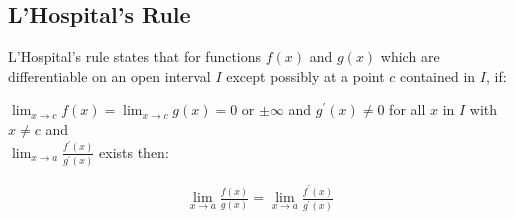 \subsection{L'Hospital's Rule}
L'Hospital's rule states that for functions $f(x)$ and $g(x)$ which are differentiable on an open interval $I$ except possibly at a point $c$ contained in $I$, if:

\vspace{5mm}

\noindent
$ \lim_{x \to c} f(x) = \lim_{x \to c} g(x) = 0$ or $\pm \infty $ and $g^{'}(x)\neq 0$ for all $x$ in $I$ with $x \neq c$ and \\

\noindent
$\lim_{x \to a} \frac{f^{'}(x)}{g^{'}(x)}$ exists then:


\begin{tcolorbox}
\begin{center}
\begin{align*}
\lim_{x \to a} \frac{f(x)}{g(x)} = \lim_{x \to a} \frac{f^{'}(x)}{g^{'}(x)}
\end{align*}
\end{center}
\end{tcolorbox} 
